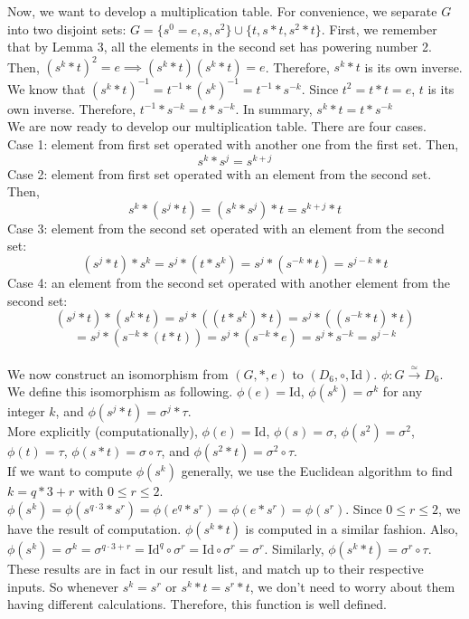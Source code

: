 \documentclass{amsart}
\begin{document}
\begin{enumerate}[itemsep=0.4in]
Now, we want to develop a multiplication table. For convenience, we separate $G$ into two disjoint sets: $G=\{s^0=e,s,s^2\}\cup\{t,s*t,s^2*t\}$. First, we remember that by Lemma 3, all the elements in the second set has powering number 2. Then, $(s^k*t)^2=e\implies (s^k*t)(s^k*t)=e$. Therefore, $s^k*t$ is its own inverse. We know that $(s^k*t)^{-1}=t^{-1}*(s^k)^{-1}=t^{-1}*s^{-k}$. Since $t^2=t*t=e$, $t$ is its own inverse. Therefore, $t^{-1}*s^{-k}=t*s^{-k}$. In summary, $s^k*t=t*s^{-k}$\\

We are now ready to develop our multiplication table. There are four cases.\\

\noindent Case 1: element from first set operated with another one from the first set. Then, $$s^k*s^j=s^{k+j}$$
Case 2: element from first set operated with an element from the second set. Then, $$s^k*(s^j*t)=(s^k*s^j)*t=s^{k+j}*t$$
Case 3: element from the second set operated with an element from the second set: $$(s^j*t)*s^k=s^j*(t*s^k)=s^j*(s^{-k}*t)=s^{j-k}*t$$
Case 4: an element from the second set operated with another element from the second set: $$(s^j*t)*(s^k*t)=s^j*((t*s^k)*t)=s^j*((s^{-k}*t)*t)$$$$=s^j*(s^{-k}*(t*t))=s^j*(s^{-k}*e)=s^j*s^{-k}=s^{j-k}$$\\

We now construct an isomorphism from $(G,*,e)$ to $(D_6,\circ,\mathrm{Id})$. $\phi:G\xrightarrow{\simeq} D_6$. We define this isomorphism as following. $\phi(e)=\mathrm{Id}$, $\phi(s^k)=\sigma^k$ for any integer $k$, and $\phi(s^j*t)=\sigma^j*\tau$.\\

More explicitly (computationally), $\phi(e)=\mathrm{Id}$, $\phi(s)=\sigma$, $\phi(s^2)=\sigma^2$, $\phi(t)=\tau$, $\phi(s*t)=\sigma\circ\tau$, and $\phi(s^2*t)=\sigma^2\circ\tau$.\\

If we want to compute $\phi(s^k)$ generally, we use the Euclidean algorithm to find $k=q*3+r$ with $0\leq r\leq2$. $\phi(s^k)=\phi(s^{q\cdot 3}*s^r)=\phi(e^q*s^r)=\phi(e*s^r)=\phi(s^r)$. Since $0\leq r\leq2$, we have the result of computation. $\phi(s^k*t)$ is computed in a similar fashion. Also, $\phi(s^k)=\sigma^k=\sigma^{q\cdot3+r}=\mathrm{Id}^q\circ\sigma^r=\mathrm{Id}\circ\sigma^r=\sigma^r$. Similarly, $\phi(s^k*t)=\sigma^r\circ\tau$. These results are in fact in our result list, and match up to their respective inputs. So whenever $s^k=s^r$ or $s^k*t=s^r*t$, we don't need to worry about them having different calculations. Therefore, this function is well defined.\\


\end{enumerate}
\end{document}
